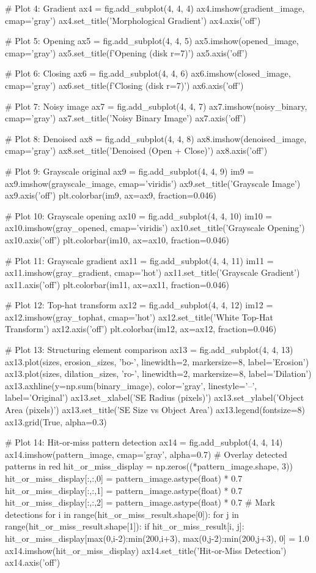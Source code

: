 \documentclass[a4paper, 11pt]{article}
\begin{document}
\begin{pycode}
# Plot 4: Gradient
ax4 = fig.add_subplot(4, 4, 4)
ax4.imshow(gradient_image, cmap='gray')
ax4.set_title('Morphological Gradient')
ax4.axis('off')

# Plot 5: Opening
ax5 = fig.add_subplot(4, 4, 5)
ax5.imshow(opened_image, cmap='gray')
ax5.set_title(f'Opening (disk r={7})')
ax5.axis('off')

# Plot 6: Closing
ax6 = fig.add_subplot(4, 4, 6)
ax6.imshow(closed_image, cmap='gray')
ax6.set_title(f'Closing (disk r={7})')
ax6.axis('off')

# Plot 7: Noisy image
ax7 = fig.add_subplot(4, 4, 7)
ax7.imshow(noisy_binary, cmap='gray')
ax7.set_title('Noisy Binary Image')
ax7.axis('off')

# Plot 8: Denoised
ax8 = fig.add_subplot(4, 4, 8)
ax8.imshow(denoised_image, cmap='gray')
ax8.set_title('Denoised (Open + Close)')
ax8.axis('off')

# Plot 9: Grayscale original
ax9 = fig.add_subplot(4, 4, 9)
im9 = ax9.imshow(grayscale_image, cmap='viridis')
ax9.set_title('Grayscale Image')
ax9.axis('off')
plt.colorbar(im9, ax=ax9, fraction=0.046)

# Plot 10: Grayscale opening
ax10 = fig.add_subplot(4, 4, 10)
im10 = ax10.imshow(gray_opened, cmap='viridis')
ax10.set_title('Grayscale Opening')
ax10.axis('off')
plt.colorbar(im10, ax=ax10, fraction=0.046)

# Plot 11: Grayscale gradient
ax11 = fig.add_subplot(4, 4, 11)
im11 = ax11.imshow(gray_gradient, cmap='hot')
ax11.set_title('Grayscale Gradient')
ax11.axis('off')
plt.colorbar(im11, ax=ax11, fraction=0.046)

# Plot 12: Top-hat transform
ax12 = fig.add_subplot(4, 4, 12)
im12 = ax12.imshow(gray_tophat, cmap='hot')
ax12.set_title('White Top-Hat Transform')
ax12.axis('off')
plt.colorbar(im12, ax=ax12, fraction=0.046)

# Plot 13: Structuring element comparison
ax13 = fig.add_subplot(4, 4, 13)
ax13.plot(sizes, erosion_sizes, 'bo-', linewidth=2, markersize=8, label='Erosion')
ax13.plot(sizes, dilation_sizes, 'ro-', linewidth=2, markersize=8, label='Dilation')
ax13.axhline(y=np.sum(binary_image), color='gray', linestyle='--', label='Original')
ax13.set_xlabel('SE Radius (pixels)')
ax13.set_ylabel('Object Area (pixels)')
ax13.set_title('SE Size vs Object Area')
ax13.legend(fontsize=8)
ax13.grid(True, alpha=0.3)

# Plot 14: Hit-or-miss pattern detection
ax14 = fig.add_subplot(4, 4, 14)
ax14.imshow(pattern_image, cmap='gray', alpha=0.7)
# Overlay detected patterns in red
hit_or_miss_display = np.zeros((*pattern_image.shape, 3))
hit_or_miss_display[:,:,0] = pattern_image.astype(float) * 0.7
hit_or_miss_display[:,:,1] = pattern_image.astype(float) * 0.7
hit_or_miss_display[:,:,2] = pattern_image.astype(float) * 0.7
# Mark detections
for i in range(hit_or_miss_result.shape[0]):
    for j in range(hit_or_miss_result.shape[1]):
        if hit_or_miss_result[i, j]:
            hit_or_miss_display[max(0,i-2):min(200,i+3), max(0,j-2):min(200,j+3), 0] = 1.0
ax14.imshow(hit_or_miss_display)
ax14.set_title('Hit-or-Miss Detection')
ax14.axis('off')


\end{pycode}
\end{document}
